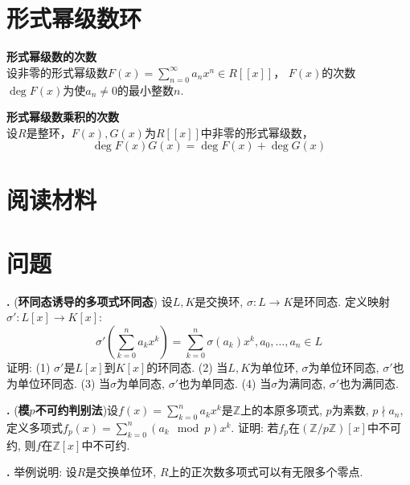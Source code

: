 \section{形式幂级数环}

\begin{dfn} \textbf{形式幂级数的次数}\\
设非零的形式幂级数$F(x)=\sum_{n=0}^\infty a_nx^n \in R[[x]]$， $F(x)$的次数$\deg F(x)$为使$a_n\neq 0$的最小整数$n$.
\end{dfn}

\begin{pro} \textbf{形式幂级数乘积的次数}\\
设$R$是整环，$F(x),G(x)$为$R[[x]]$中非零的形式幂级数，
\begin{equation}
    \deg F(x)G(x)=\deg F(x)+\deg G(x)
\end{equation}
\end{pro}


\section*{阅读材料}

\section*{问题}

\par \textbf{\theprobpoly .} (\textbf{环同态诱导的多项式环同态}) 设$L,K$是交换环, $\sigma: L\to K$是环同态. 定义映射$\sigma':L[x]\to K[x]$:
\begin{equation}
    \sigma'\left(\sum_{k=0}^n a_k x^k\right) = \sum_{k=0}^n \sigma(a_k) x^k, a_0,\dots,a_n \in L
\end{equation}
证明: (1) $\sigma'$是$L[x]$到$K[x]$的环同态. (2) 当$L,K$为单位环, $\sigma$为单位环同态, $\sigma'$也为单位环同态. (3) 当$\sigma$为单同态, $\sigma'$也为单同态. (4) 当$\sigma$为满同态, $\sigma'$也为满同态. 

\par \textbf{\theprobpoly .} (\textbf{模$p$不可约判别法})设$f(x)=\sum_{k=0}^n a_kx^k$是$\mathbb{Z}$上的本原多项式, $p$为素数, $p\nmid a_n$, 定义多项式$f_p(x)=\sum_{k=0}^n (a_k \mod p) x^k$. 证明: 若$f_p$在$(\mathbb{Z}/p\mathbb{Z})[x]$中不可约, 则$f$在$\mathbb{Z}[x]$中不可约. 

\par \textbf{\theprobpoly .} 举例说明: 设$R$是交换单位环, $R$上的正次数多项式可以有无限多个零点. 

